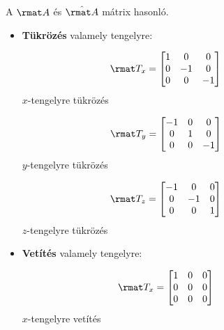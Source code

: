 \documentclass[a4paper, 12pt]{scrartcl}
\begin{document}
\begin{note}
  A $\rmat A$ és $\hat{\rmat A}$ mátrix hasonló.
\end{note}

\begin{blueBox}

  \begin{itemize}
    \item \textbf{Tükrözés} valamely tengelyre:
          \vspace{-11mm}
          \begin{multicols}{3}
            \centering
            $$
              \rmat T_x = \begin{bmatrix}
                1 & 0  & 0  \\
                0 & -1 & 0  \\
                0 & 0  & -1
              \end{bmatrix}
              \phantom{= \rmat T_x}
            $$
            $x$-tengelyre tükrözés

            $$
              \rmat T_y = \begin{bmatrix}
                -1 & 0 & 0  \\
                0  & 1 & 0  \\
                0  & 0 & -1
              \end{bmatrix}
              \phantom{= \rmat T_y}
            $$
            $y$-tengelyre tükrözés

            $$
              \rmat T_z = \begin{bmatrix}
                -1 & 0  & 0 \\
                0  & -1 & 0 \\
                0  & 0  & 1
              \end{bmatrix}
              \phantom{= \rmat T_z}
            $$
            $z$-tengelyre tükrözés
          \end{multicols}
          \vspace{-3mm}

    \item \textbf{Vetítés} valamely tengelyre:
          \vspace{-11mm}
          \begin{multicols}{3}
            \centering
            $$
              \rmat T_x = \begin{bmatrix}
                1 & 0 & 0 \\
                0 & 0 & 0 \\
                0 & 0 & 0
              \end{bmatrix}
              \phantom{= \rmat T_x}
            $$
            $x$-tengelyre vetítés


\end{multicols}
\end{itemize}
\end{blueBox}
\end{document}
